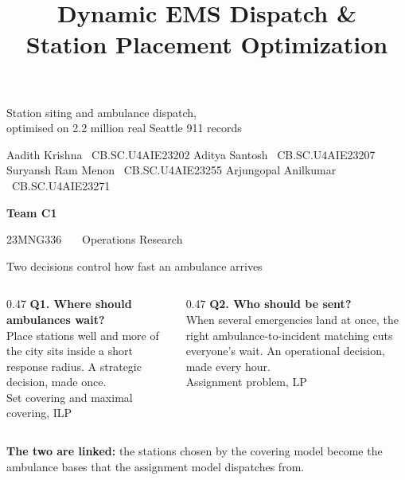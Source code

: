 \documentclass[aspectratio=169,10pt]{beamer}
\title{Dynamic EMS Dispatch \&\\Station Placement Optimization}
\newcommand{\hairline}[1][0.6em]{%
  \par\vspace{0.3em}\noindent{\color{rule}\rule{\textwidth}{0.6pt}}\par\vspace{#1}%
}
\begin{document}
\begin{frame}[plain]
  \vspace{1.4em}
  {\color{inkp}\inserttitle\par}
  \vspace{0.7em}{\color{rule}\rule{0.45\textwidth}{1.2pt}}\par
  \vspace{0.7em}
  {\large\color{inks}Station siting and ambulance dispatch,\\
   optimised on 2.2 million real Seattle 911 records\par}
  \vspace{1.7em}
  {\footnotesize\color{inks}%
   Aadith Krishna \ {\color{inkm}CB.SC.U4AIE23202}\hfill
   Aditya Santosh \ {\color{inkm}CB.SC.U4AIE23207}\\[0.4em]
   Suryansh Ram Menon \ {\color{inkm}CB.SC.U4AIE23255}\hfill
   Arjungopal Anilkumar \ {\color{inkm}CB.SC.U4AIE23271}\par}
  \vspace{1.2em}
  {\footnotesize\color{inks}\textbf{Team C1}\par}
  \vspace{0.2em}
  {\footnotesize\color{inkm}23MNG336 \ \textbar\ \ Operations Research\par}
\end{frame}

\begin{frame}{Two decisions control how fast an ambulance arrives}
  \vspace{0.6em}
  \begin{columns}[T,onlytextwidth]
    \begin{column}{0.47\textwidth}
      {\color{s1}\textbf{\large Q1. Where should ambulances wait?}}\\[0.5em]
      {\color{inks}Place stations well and more of the city sits inside a
       short response radius. A strategic decision, made once.}\\[0.9em]
      {\footnotesize\color{inkm}Set covering and maximal covering, ILP}
    \end{column}
    \begin{column}{0.47\textwidth}
      {\color{s2}\textbf{\large Q2. Who should be sent?}}\\[0.5em]
      {\color{inks}When several emergencies land at once, the right
       ambulance-to-incident matching cuts everyone's wait. An operational
       decision, made every hour.}\\[0.9em]
      {\footnotesize\color{inkm}Assignment problem, LP}
    \end{column}
  \end{columns}
  \vspace{1.3em}
  \hairline[0.6em]
  \centering
  \textbf{The two are linked:} the stations chosen by the covering model
  become the ambulance bases that the assignment model dispatches from.
\end{frame}
\end{document}
